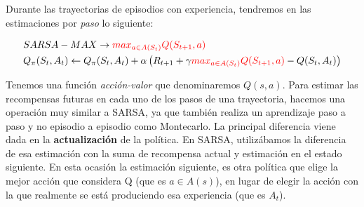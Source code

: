 \documentclass[11pt,fleqn]{book} %
\begin{document}
%
%
%
%	

Durante las trayectorias de episodios con experiencia, tendremos en las estimaciones por \textit{paso} lo siguiente:

\begin{align}
\begin{split}
&SARSA-MAX \rightarrow \color{red}max_{a\in A(S_t)}Q(S_{t+1},a)\color{black} \\
&Q_\pi(S_t,A_t) \leftarrow Q_\pi(S_t,A_t)+\alpha\left(R_{t+1}+\gamma \color{red}max_{a\in A(S_t)}Q(S_{t+1},a)\color{black} - Q(S_t,A_t)\right)
\end{split}
\end{align}

Tenemos una función \textit{acción-valor} que denominaremos $Q(s,a)$. Para estimar las recompensas futuras en cada uno de los pasos de una trayectoria, hacemos una operación muy similar a SARSA, ya que también realiza un aprendizaje paso a paso y no episodio a episodio como Montecarlo. La principal diferencia viene dada en la \textbf{actualización} de la política. En SARSA, utilizábamos la diferencia de esa estimación con la suma de recompensa actual y estimación en el estado siguiente. En esta ocasión la estimación siguiente, es otra política que elige la mejor acción que considera Q (que es $a \in A(s)$), en lugar de elegir la acción con la que realmente se está produciendo esa experiencia (que es $A_t$).\\
\end{document}
